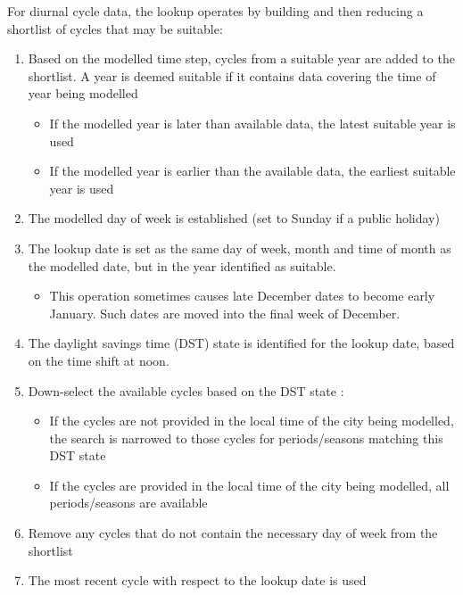 \documentclass[letterpaper,10pt,english]{sphinxmanual}
\begin{document}
For diurnal cycle data, the lookup operates by building and then
reducing a shortlist of cycles that may be suitable:
\begin{enumerate}
\item {} 
Based on the modelled time step, cycles from a suitable year are
added to the shortlist. A year is deemed suitable if it contains data
covering the time of year being modelled
\begin{itemize}
\item {} 
If the modelled year is later than available data, the latest
suitable year is used

\item {} 
If the modelled year is earlier than the available data, the
earliest suitable year is used

\end{itemize}

\item {} 
The modelled day of week is established (set to Sunday if a public
holiday)

\item {} 
The lookup date is set as the same day of week, month and time of
month as the modelled date, but in the year identified as suitable.
\begin{itemize}
\item {} 
This operation sometimes causes late December dates to become
early January. Such dates are moved into the final week of
December.

\end{itemize}

\item {} 
The daylight savings time (DST) state is identified for the lookup
date, based on the time shift at noon.

\item {} 
Down-select the available cycles based on the DST state
:
\begin{itemize}
\item {} 
If the cycles are not provided in the local time of the city being
modelled, the search is narrowed to those cycles for
periods/seasons matching this DST state

\item {} 
If the cycles are provided in the local time of the city being
modelled, all periods/seasons are available

\end{itemize}

\item {} 
Remove any cycles that do not contain the necessary day of week from
the shortlist

\item {} 
The most recent cycle with respect to the lookup date is used

\end{enumerate}
\end{document}
